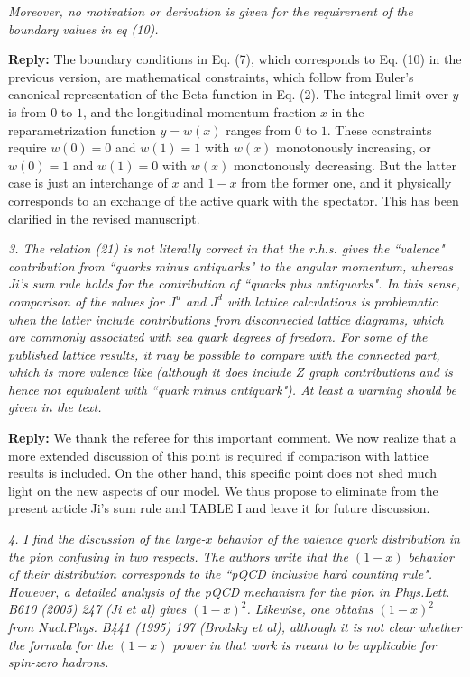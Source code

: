 \documentclass[12pt]{article}
\begin{document}
{\it Moreover, no motivation or derivation is given for the
requirement of the boundary values in eq (10).}

{\bf Reply:} The boundary conditions in Eq. (7), which corresponds to Eq. (10) in the previous version, are mathematical constraints, which follow from Euler's canonical representation of the Beta function in Eq. (2). The integral limit over $y$ is from $0$ to $1$, and the longitudinal momentum fraction $x$ in the reparametrization function $y=w(x)$ ranges from $0$ to $1$. These constraints require $w(0)=0$ and $w(1)=1$ with $w(x)$ monotonously increasing, or $w(0)=1$ and $w(1)=0$ with $w(x)$ monotonously decreasing. But the latter case is just an interchange of $x$ and $1-x$ from the former one, and it physically corresponds to an exchange of the active quark with the spectator. This has been clarified in the revised manuscript.


{\it 3. The relation (21) is not literally correct in that the r.h.s. gives
the ``valence" contribution from ``quarks minus antiquarks" to the
angular momentum, whereas Ji's sum rule holds for the contribution of
``quarks plus antiquarks". In this sense, comparison of the values for
$J^u$ and $J^d$ with lattice calculations is problematic when the latter
include contributions from disconnected lattice diagrams, which are
commonly associated with sea quark degrees of freedom. For some of the
published lattice results, it may be possible to compare with the
connected part, which is more valence like (although it does include $Z$
graph contributions and is hence not equivalent with ``quark minus
antiquark"). At least a warning should be given in the text.}

{\bf Reply:}  We thank the referee for this important comment. We now realize that a more extended discussion of this point is required if comparison with lattice results is included. On the other hand, this specific point does not shed much light on the new aspects of our model. We thus propose to eliminate from the present article Ji's sum rule and TABLE I and leave it for future discussion. 


{\it 4. I find the discussion of the large-$x$ behavior of the valence quark
distribution in the pion confusing in two respects. The authors write
that the $(1-x)$ behavior of their distribution corresponds to the
``pQCD inclusive hard counting rule". However, a detailed analysis of
the pQCD mechanism for the pion in Phys.Lett. B610 (2005) 247 (Ji et
al) gives $(1-x)^2$. Likewise, one obtains $(1-x)^2$ from Nucl.Phys. B441
(1995) 197 (Brodsky et al), although it is not clear whether the
formula for the $(1-x)$ power in that work is meant to be applicable for
spin-zero hadrons.}
\end{document}
